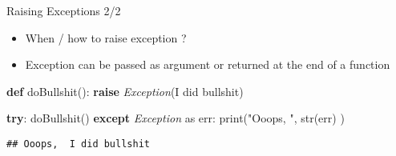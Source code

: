 \documentclass[
  8pt,
  ignorenonframetext,
]{beamer}
\newenvironment{Shaded}{\begin{snugshade}}{\end{snugshade}}
\newcommand{\BuiltInTok}[1]{#1}
\newcommand{\ControlFlowTok}[1]{\textcolor[rgb]{0.13,0.29,0.53}{\textbf{#1}}}
\newcommand{\ImportTok}[1]{#1}
\newcommand{\KeywordTok}[1]{\textcolor[rgb]{0.13,0.29,0.53}{\textbf{#1}}}
\newcommand{\NormalTok}[1]{#1}
\newcommand{\PreprocessorTok}[1]{\textcolor[rgb]{0.56,0.35,0.01}{\textit{#1}}}
\newcommand{\StringTok}[1]{\textcolor[rgb]{0.31,0.60,0.02}{#1}}
\begin{document}
\begin{frame}[fragile]{Raising Exceptions 2/2}
\protect\hypertarget{raising-exceptions-22}{}
\begin{itemize}
\item
  When / how to raise exception ?
\item
  Exception can be passed as argument or returned at the end of a
  function
\end{itemize}

\begin{Shaded}
\begin{Highlighting}[]
\KeywordTok{def}\NormalTok{ doBullshit():}
  \ControlFlowTok{raise} \PreprocessorTok{Exception}\NormalTok{(}\StringTok{\textquotesingle{}I did bullshit\textquotesingle{}}\NormalTok{)}

\ControlFlowTok{try}\NormalTok{:}
\NormalTok{  doBullshit()}
\ControlFlowTok{except} \PreprocessorTok{Exception} \ImportTok{as}\NormalTok{ err:}
  \BuiltInTok{print}\NormalTok{(}\StringTok{"Ooops, "}\NormalTok{, }\BuiltInTok{str}\NormalTok{(err) )}
    
\end{Highlighting}
\end{Shaded}

\begin{verbatim}
## Ooops,  I did bullshit
\end{verbatim}
\end{frame}
\end{document}
